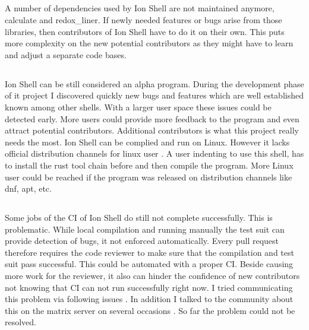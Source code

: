 \subsection{\itemIonShellDependencies}\label{itemIonShellDependencies}

A number of dependencies used by Ion Shell are not maintained anymore, calculate and redox\_liner.
If newly needed features or bugs arise from those libraries,
then contributors of Ion Shell have to do it on their own.
This puts more complexity on the new potential contributors
as they might have to learn and adjust a separate code bases.

\subsection{\itemIonShellDistribution}\label{itemIonShellDistribution}

Ion Shell can be still considered an alpha program.
During the development phase of it project I discovered quickly new bugs
and features which are well established known among other shells.
With a larger user space these issues could be detected early.
More users could provide more feedback to the program and even attract potential contributors.
Additional contributors is what this project really needs the most.
Ion Shell can be complied and run on Linux.
However it lacks official distribution channels for linux user .
A user indenting to use this shell, has to install the rust tool chain before and then compile the program.
More Linux user could be reached if the program was released on distribution channels like dnf, apt, etc.

\subsection{\itemIonShellCI}\label{section:ci_ion_shell}

Some jobs of the CI of Ion Shell do still not complete successfully.
This is problematic. While local compilation and running manually
the test suit can provide detection of bugs, it not enforced automatically.
Every pull request therefore requires the code reviewer to
make sure that the compilation and test suit pass successful.
This could be automated with a proper CI.
Beside causing more work for the reviewer, it also can hinder
the confidence of new contributors not knowing that CI can not run successfully right now.
I tried communicating this problem via following issues \cite{issue_ci_linux_stable_fail}.
In addition I talked to the community
about this on the matrix server on several occasions \cite{matrix_channel}.
So far the problem could not be resolved.

